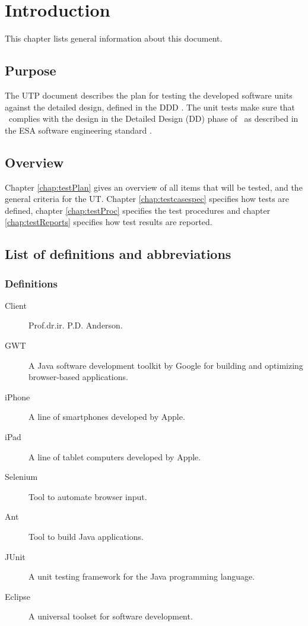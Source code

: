\chapter{Introduction}\label{chap:intro}
This chapter lists general information about this document.

\section{Purpose}
The UTP document describes the plan for testing the developed software units against the
detailed design, defined in the DDD \cite{DDD}. The unit tests make sure that \projectname\ complies
with the design in the Detailed Design (DD) phase of \projectname\ as described in
the ESA software engineering standard \cite{esa}.

\section{Overview}
\label{sec:overview}

Chapter \ref{chap:testPlan} gives an overview of all items that will be tested, and the general criteria for the UT.
Chapter \ref{chap:testcasespec} speciﬁes how tests are defined, chapter \ref{chap:testProc} specifies the test procedures and chapter \ref{chap:testReports} speciﬁes how test results are reported.


\section{List of definitions and abbreviations}
\label{sec:listofdef}


\subsection{Definitions}
\label{subsec:def}


\begin{description}


\item[Client] Prof.dr.ir. P.D. Anderson.
\item[GWT] A Java software development toolkit by Google for building and optimizing browser-based applications.
\item[iPhone] A line of smartphones developed by Apple.
\item[iPad] A line of tablet computers developed by Apple.
\item[Selenium] Tool to automate browser input.
\item[Ant] Tool to build Java applications.
\item[JUnit] A unit testing framework for the Java programming language.
\item[Eclipse] A universal toolset for software development.
\end{description}

